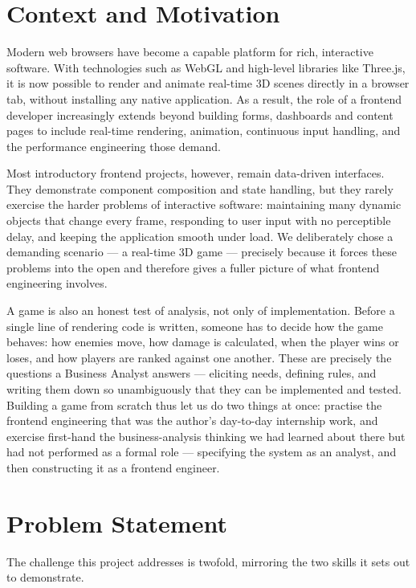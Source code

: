 \documentclass[12pt,a4paper]{report}
\begin{document}
\section{Context and Motivation}

Modern web browsers have become a capable platform for rich, interactive
software. With technologies such as WebGL and high-level libraries like
Three.js, it is now possible to render and animate real-time 3D scenes directly
in a browser tab, without installing any native application. As a result, the
role of a frontend developer increasingly extends beyond building forms,
dashboards and content pages to include real-time rendering, animation,
continuous input handling, and the performance engineering those demand.

Most introductory frontend projects, however, remain data-driven interfaces.
They demonstrate component composition and state handling, but they rarely
exercise the harder problems of interactive software: maintaining many dynamic
objects that change every frame, responding to user input with no perceptible
delay, and keeping the application smooth under load. We deliberately chose a
demanding scenario --- a real-time 3D game --- precisely because it forces these
problems into the open and therefore gives a fuller picture of what frontend
engineering involves.

A game is also an honest test of analysis, not only of implementation. Before a
single line of rendering code is written, someone has to decide how the game
behaves: how enemies move, how damage is calculated, when the player wins or
loses, and how players are ranked against one another. These are precisely the
questions a Business Analyst answers --- eliciting needs, defining rules, and
writing them down so unambiguously that they can be implemented and tested.
Building a game from scratch thus let us do two things at once: practise the
frontend engineering that was the author's day-to-day internship work, and
exercise first-hand the business-analysis thinking we had learned about there
but had not performed as a formal role --- specifying the system as an analyst,
and then constructing it as a frontend engineer.

\section{Problem Statement}

The challenge this project addresses is twofold, mirroring the two skills it
sets out to demonstrate.
\end{document}

